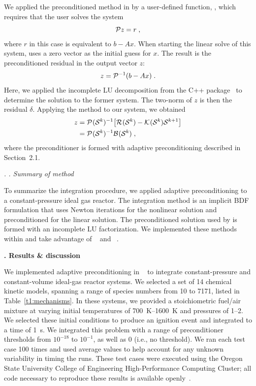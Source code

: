\documentclass[twocolumn,10pt]{article}
\renewcommand{\section}%
              [1]%
              {%
               \bgroup%
               \flushleft%
               \small\bf%
               \stepcounter{section}%
               \arabic{section}. #1%
               \par%
               \egroup%
              }%
\renewcommand{\subsection}%
              [1]%
              {%
               \bgroup%
               \flushleft%
               \small\em%
               \stepcounter{subsection}%
               \arabic{section}.%
               \arabic{subsection}. #1%
               \par%
               \egroup%
              }%
\newcommand{\sectionOne}[1]{\section{#1} \addvspace{10pt}}
\newcommand{\sectionTwo}[1]{\subsection{#1} \addvspace{10pt}}
\begin{document}
We applied the preconditioned \gmres{} method in \cvodes{} by a user-defined function, \psolve{}, which requires that the user solves the system
\begin{equation}
    \mathcal{P}{}z = r \;,
\end{equation}
where $r$ in this case is equivalent to $b-Ax$. When starting the linear solve of this system, \cvodes{} uses a zero vector as the initial guess for $x$.
The result is the preconditioned residual in the output vector $z$:
\begin{equation}
    z =\mathcal{P}{}^{-1}(b-Ax) \;.
\end{equation}
Here, we applied the incomplete LU decomposition from the \eigen{} C++ package~\cite{guennebaud_eigen_2010} to determine the solution to the former system.
The two-norm of $z$ is then the residual $\delta$.
Applying the \cvodes{} method to our system, we obtained
\begin{align}
    z &= \mathcal{P}^{}(\mathcal{S}^{k})^{-1}\big[\mathcal{R}^{}(\mathcal{S}{}^{k})-\mathcal{K}^{}(\mathcal{S}{}^{k})\mathcal{S}{}^{k+1}\big] \nonumber \\
    &= \mathcal{P}^{}(\mathcal{S}^{k})^{-1}\mathcal{B}^{}(\mathcal{S}{}^{k}) \;,
\end{align}
where the preconditioner is formed with adaptive preconditioning described in Section~2.1.

\sectionTwo{Summary of method}

To summarize the integration procedure, we applied adaptive preconditioning to a constant-pressure ideal gas reactor.
The integration method is an implicit BDF formulation that uses Newton iterations for the nonlinear solution and preconditioned \gmres{} for the linear solution.
The preconditioned solution used by \gmres{} is formed with an incomplete LU factorization.
We implemented these methods within \cantera{} and take advantage of \sundials{}~\cite{hindmarsh_sundials_2005} and \eigen{}~\cite{guennebaud_eigen_2010}.

\sectionOne{Results \& discussion}

We implemented adaptive preconditioning in \cantera{}~\cite{cantera} to integrate constant-pressure and constant-volume ideal-gas reactor systems.
We selected a set of 14 chemical kinetic models, spanning a range of species numbers from 10 to 7171, listed in Table~\ref{t1:mechanisms}.
In these systems, we provided a stoichiometric fuel/air mixture at varying initial temperatures of \SIrange{700}{1600}{\kelvin} and pressures of \SIrange{1}{2}{\atm}.
We selected these initial conditions to produce an ignition event and integrated to a time of \SI{1}{\second}.
We integrated this problem with a range of preconditioner thresholds from $10^{-18}$ to $10^{-1}$, as well as 0 (i.e., no threshold).
We ran each test case 100 times and used average values to help account for any unknown variability in timing the runs.
These test cases were executed using the Oregon State University College of Engineering High-Performance Computing Cluster; all code necessary to reproduce these results is available openly~\cite{testing_package}.
\end{document}
